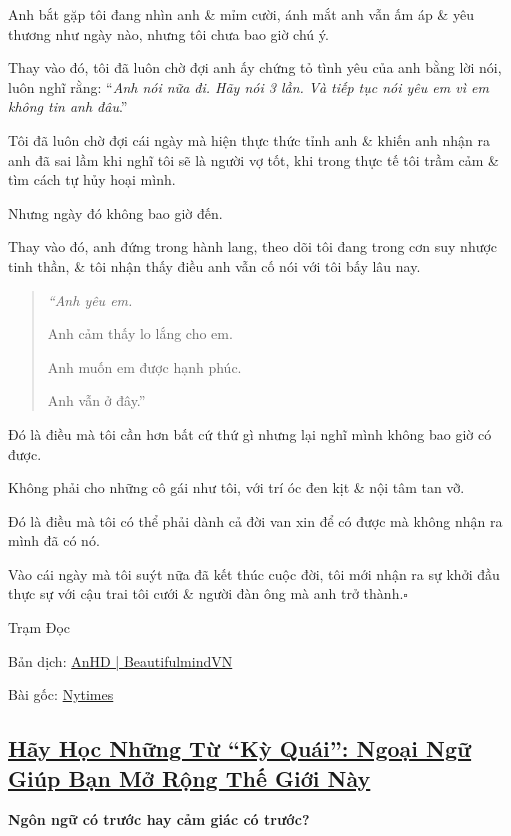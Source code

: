 \documentclass{article}
\begin{document}
%
Anh bắt gặp tôi đang nhìn anh \& mỉm cười, ánh mắt anh vẫn ấm áp \& yêu thương như ngày nào, nhưng tôi chưa bao giờ chú ý.

Thay vào đó, tôi đã luôn chờ đợi anh ấy chứng tỏ tình yêu của anh bằng lời nói, luôn nghĩ rằng: ``\textit{Anh nói nữa đi. Hãy nói 3 lần. Và tiếp tục nói yêu em vì em không tin anh đâu}.''

%
Tôi đã luôn chờ đợi cái ngày mà hiện thực thức tỉnh anh \& khiến anh nhận ra anh đã sai lầm khi nghĩ tôi sẽ là người vợ tốt, khi trong thực tế tôi trầm cảm \& tìm cách tự hủy hoại mình.

Nhưng ngày đó không bao giờ đến.

%
Thay vào đó, anh đứng trong hành lang, theo dõi tôi đang trong cơn suy nhược tinh thần, \& tôi nhận thấy điều anh vẫn cố nói với tôi bấy lâu nay.

\begin{quotation}
	\it
	``Anh yêu em.
	
	Anh cảm thấy lo lắng cho em.
	
	Anh muốn em được hạnh phúc.
	
	Anh vẫn ở đây.''    
\end{quotation}
Đó là điều mà tôi cần hơn bất cứ thứ gì nhưng lại nghĩ mình không bao giờ có được.

Không phải cho những cô gái như tôi, với trí óc đen kịt \& nội tâm tan vỡ.

Đó là điều mà tôi có thể phải dành cả đời van xin để có được mà không nhận ra mình đã có nó.

Vào cái ngày mà tôi suýt nữa đã kết thúc cuộc đời, tôi mới nhận ra sự khởi đầu thực sự với cậu trai tôi cưới \& người đàn ông mà anh trở thành.\hfill$\square$

\begin{flushright}
	Trạm Đọc
	
	Bản dịch: \href{https://beautifulmindvn.com/2016/05/11/tro-lai-tu-bo-vuc/}{AnHD | BeautifulmindVN}
	
	Bài gốc: \href{https://www.nytimes.com/2015/06/07/style/crawling-back-from-the-ledge.html?_r=2}{Nytimes}
\end{flushright}


\subsection{\href{http://tramdoc.vn/tin-tuc/hay-hoc-nhung-tu-ky-quai-ngoai-ngu-giup-ban-mo-rong-the-gioi-nay-nDdaOW.html}{Hãy Học Những Từ ``Kỳ Quái'': Ngoại Ngữ Giúp Bạn Mở Rộng Thế Giới Này}}
\textbf{ Ngôn ngữ có trước hay cảm giác có trước?}
\end{document}
